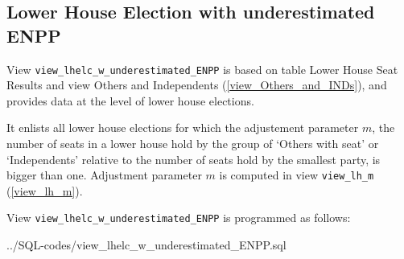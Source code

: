 \subsection{Lower House Election with underestimated ENPP}\label{view_lhelc_w_underestimated_ENPP}
View \texttt{\footnotesize view\_lhelc\_w\_underestimated\_ENPP} is based on table Lower House Seat Results and view Others and Independents (\ref{view_Others_and_INDs}), and provides data at the level of lower house elections.

It enlists all lower house elections for which the adjustement parameter $m$, the number of seats in a lower house hold by the group of  `Others with seat' or `Independents' relative to the number of seats hold by the smallest party, is bigger than one. Adjustment parameter $m$ is computed in view \texttt{\footnotesize view\_lh\_m} (\ref{view_lh_m}).


View \texttt{\footnotesize view\_lhelc\_w\_underestimated\_ENPP} is programmed as follows: 

%
{../SQL-codes/view_lhelc_w_underestimated_ENPP.sql}
